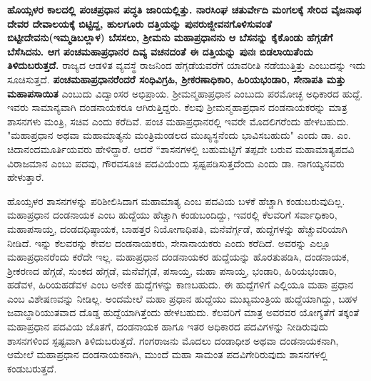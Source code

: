 \textbf{ಹೊಯ್ಸಳರ ಕಾಲದಲ್ಲಿ ಪಂಚಪ್ರಧಾನ ಪದ್ಧತಿ ಜಾರಿಯಲ್ಲಿತ್ತು. ನಾರಸಿಂಘ ಚತುರ್ವೇದಿ ಮಂಗಲಕ್ಕೆ ಸೇರಿದ ವೈಜನಾಥ ದೇವರ ದೇವಾಲಯಕ್ಕೆ ಬಿಟ್ಟಿದ್ದ, ಹುಲಗೂರು ದತ್ತಿಯನ್ನು ಪುನರುಜ್ಜೀವನಗೊಳಿಸುವಂತೆ ಬಿಟ್ಟೀದೇವನು(ಇಮ್ಮಡಿಬಲ್ಲಾಳ) ಬೆಸಸಲು, ಶ‍್ರೀಮನು ಮಹಾಪ್ರಧಾನನು ಆ ಬೆಸನನ್ನು ಕೈಕೊಂಡು ಹೆಗ್ಗಡೆಗೆ ಬೆಸೆಸಿದನು. ಆಗ ಪಂಚಮಹಾಪ್ರಧಾನರ ದಿವ್ಯ ವಚನದಂತೆ ಈ ದತ್ತಿಯನ್ನು ಪುನಃ ಬಿಡಲಾಯಿತೆಂದು ತಿಳಿದುಬರುತ್ತದೆ.} ರಾಜ್ಯದ ಆಡಳಿತ ವ್ಯವಸ್ಥೆ ರಾಜನಿಂದ ಹೆಗ್ಗಡೆಯವರೆಗೆ ಯಾವರೀತಿ ನಡೆಯುತ್ತಿತ್ತು ಎಂಬುದನ್ನು ಇದು ಸೂಚಿಸುತ್ತದೆ. \textbf{ಪಂಚಮಹಾಪ್ರಧಾನರೆಂದರೆ ಸಂಧಿವಿಗ್ರಹಿ, ಶ‍್ರೀಕರಣಾಧಿಕಾರಿ, ಹಿರಿಯಭಂಡಾರಿ, ಸೇನಾಪತಿ ಮತ್ತು ಮಹಾಪಸಾಯಿತ} ಎಂಬುದು ವಿದ್ವಾಂಸರ ಅಭಿಪ್ರಾಯ. ಶ‍್ರೀಮನ್ಮಹಾಪ್ರಧಾನ ಎಂಬುದು ಪರಮೋಚ್ಛ ಅಧಿಕಾರದ ಹುದ್ದೆ. ಇವರು ಸಾಮಾನ್ಯವಾಗಿ ದಂಡನಾಯಕರೂ ಆಗಿರುತ್ತಿದ್ದರು. ಕೆಲವು ಶ‍್ರೀಮನ್ಮಹಾಪ್ರಧಾನ ದಂಡನಾಯಕರನ್ನು ಮಾತ್ರ ಶಾಸನಗಳು ಮಂತ್ರಿ, ಸಚಿವ ಎಂದು ಕರೆದಿವೆ. ಪಂಚ ಮಹಾಪ್ರಧಾನ\-ರಲ್ಲಿ ಇವರೇ ಮೊದಲಿಗರೆಂದು ಹೇಳಬಹುದು. "ಮಹಾಪ್ರಧಾನ ಅಥವಾ ಮಹಾಮಾತ್ಯನು ಮಂತ್ರಿಮಂಡಲದ ಮುಖ್ಯಸ್ಥನೆಂದು ಭಾವಿಸಬಹುದು" ಎಂದು ಡಾ. ಎಂ. ಚಿದಾನಂದಮೂರ್ತಿಯವರು ಹೇಳಿದ್ದಾರೆ. ಆದರೆ “ಶಾಸನ\-ಗಳಲ್ಲಿ ಬಹುಮಟ್ಟಿಗೆ ತಪ್ಪದೇ ಬರುವ ಮಹಾಮಾತ್ಯಪದವಿ ವಿರಾಜಮಾನ ಎಂಬು ಪದವು, ಗೌರವಸೂಚಿ ಪದವಿಯೆಂದು ಸ್ಪಷ್ಟಪಡಿಸುತ್ತದೆಂದು ಎಂದು ಡಾ. ನಾಗಯ್ಯನವರು ಹೇಳುತ್ತಾರೆ.

ಹೊಯ್ಸಳರ ಶಾಸನಗಳನ್ನು ಪರಿಶೀಲಿಸಿದಾಗ ಮಹಾಮಾತ್ಯ ಎಂಬ ಪದವಿಯ ಬಳಕೆ ಹೆಚ್ಚಾಗಿ ಕಂಡುಬರುವುದಿಲ್ಲ. ಮಹಾಪ್ರಧಾನ ದಂಡನಾಯಕ ಎಂಬ ಹುದ್ದೆಯು ಹೆಚ್ಚಾಗಿ ಕಂಡುಬಂದಿದ್ದು, ಇವರಲ್ಲಿ ಕೆಲವರಿಗೆ ಸರ್ವಾಧಿಕಾರಿ, ಮಹಾಪಸಾಯ್ತ, ದಂಡದಧಿಷ್ಠಾಯಕ, ಬಾಹತ್ತರ ನಿಯೋಗಾಧಿಪತಿ, ಮನೆವೆರ್ಗ್ಗಡೆ, ಹುದ್ದೆಗಳನ್ನು ಹೆಚ್ಚುವರಿಯಾಗಿ ನೀಡಿದೆ. ಇನ್ನು ಕೆಲವರನ್ನು ಕೇವಲ ದಂಡನಾಯಕರು, ಸೇನಾನಾಯಕರು ಎಂದು ಕರೆದಿದೆ. ಅವರನ್ನು ಎಲ್ಲೂ ಮಹಾಪ್ರಧಾನರೆಂದು ಕರೆದೇ ಇಲ್ಲ. ಮಹಾಪ್ರಧಾನ ದಂಡನಾಯಕರ ಹುದ್ದೆಯನ್ನು ಹೊರತುಪಡಿಸಿ, ದಂಡನಾಯಕ, ಶ‍್ರೀಕರಣದ ಹೆಗ್ಗಡೆ, ಸುಂಕದ ಹೆಗ್ಗಡೆ, ಮನೆವೆಗ್ಗಡೆ, ಪಸಾಯ್ತ, ಮಹಾ ಪಸಾಯ್ತ, ಭಂಡಾರಿ, ಹಿರಿಯಭಂಡಾರಿ, ಹಡೆವಳ, ಹಿರಿಯಹಡೆವಳ ಎಂಬ ಅನೇಕ ಹುದ್ದೆಗಳನ್ನು ಕಾಣಬಹುದು. ಈ ಹುದ್ದೆಗಳಿಗೆ ಎಲ್ಲಿಯೂ ಮಹಾ ಪ್ರಧಾನ ಎಂಬ ವಿಶೇಷಣವನ್ನು ನೀಡಿಲ್ಲ. ಅಂದಮೇಲೆ ಮಹಾ ಪ್ರಧಾನ ಹುದ್ದೆಯು ಮುಖ್ಯಮಂತ್ರಿಯ ಹುದ್ದೆಯಾಗಿದ್ದು, ಬಹಳ ಜವಾಬ್ದಾರಿಯುತವಾದ ದೊಡ್ಡ ಹುದ್ದೆಯಾಗಿತ್ತೆಂದು ಹೇಳಬಹುದು. ಕೆಲವರಿಗೆ ಮಾತ್ರ ಅವರವರ ಯೋಗ್ಯತೆಗೆ ತಕ್ಕಂತೆ ಮಹಾಪ್ರಧಾನ ಪದವಿಯ ಜೊತಗೆ, ದಂಡನಾಯಕ ಹಾಗೂ ಇತರ ಅಧಿಕಾರದ ಪದವಿಗಳನ್ನು ನೀಡಿರುವುದು ಶಾಸನಗಳಿಂದ ಸ್ಪಷ್ಟವಾಗಿ ತಿಳಿದುಬರುತ್ತದೆ. ಗಂಗರಾಜನು ಮೊದಲು ದಂಡಾಧೀಶ ಅಥವಾ ದಂಡನಾಯಕನಾಗಿ, ಆಮೇಲೆ ಮಹಾಪ್ರಧಾನ ದಂಡನಾಯಕನಾಗಿ, ಮುಂದೆ ಮಹಾ ಸಾಮಂತ ಪದವಿಗೇರಿರುವುದು ಶಾಸನಗಳಲ್ಲಿ ಕಂಡುಬರುತ್ತದೆ.

